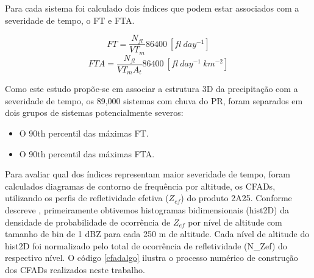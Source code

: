 \documentclass[preprint,authoryear,3p]{elsarticle}
\begin{document}
\begin{multicols}{2}
Para cada sistema foi calculado dois índices que podem estar associados com a severidade de tempo, o FT e FTA.

\begin{equation}
FT = \frac{N_{fl} }{VT_m} 86400 ~[fl~day^{-1}]    
\end{equation}
\begin{equation}
FTA = \frac{N_{fl} }{VT_m A_t } 86400 ~[fl~day^{-1}~km^{-2}]
\end{equation}

Como este estudo propõe-se em associar a estrutura 3D da precipitação com a severidade de tempo, os 89,000 sistemas com chuva do PR, foram separados em dois grupos de sistemas potencialmente severos:

\begin{itemize}
\item O 90th percentil das máximas FT.
\item O 90th percentil das máximas FTA.
\end{itemize}

Para avaliar qual dos índices representam maior severidade de tempo, foram calculados diagramas de contorno de frequência por altitude, os CFADs, utilizando os perfis de refletividade efetiva ($Z_{ef}$) do produto 2A25. Conforme descreve \cite{yuter1995}, primeiramente obtivemos histogramas bidimensionais (hist2D) da densidade de probabilidade de ocorrência de $Z_{ef}$ por nível de altitude com tamanho de bin de 1 dBZ para cada 250 m de altitude. Cada nível de altitude do hist2D foi normalizado pelo total de ocorrência de refletividade (N\_Zef) do respectivo nível. O código \ref{cfadalgo} ilustra o processo numérico de construção dos CFADs realizados neste trabalho.

{

}


%


\end{multicols}
\end{document}
